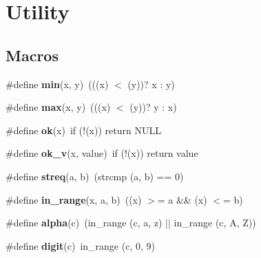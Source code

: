 \hypertarget{group__util}{}\section{Utility}
\label{group__util}
\subsection*{Macros}
\begin{DoxyCompactItemize}
\item 
\mbox{\label{group__util_gabb702d8b501669a23aa0ab3b281b9384}} 
\#define {\bfseries min}(x,  y)~(((x) $<$ (y))? x \+: y)
\item 
\mbox{\label{group__util_gac39d9cef6a5e030ba8d9e11121054268}} 
\#define {\bfseries max}(x,  y)~(((x) $<$ (y))? y \+: x)
\item 
\mbox{\label{group__util_ga978d2d13a74f00232a0dfa306776a343}} 
\#define {\bfseries ok}(x)~if (!(x)) return N\+U\+LL
\item 
\mbox{\label{group__util_ga2e5f7da3a0f150887e71ad1904250a6a}} 
\#define {\bfseries ok\+\_\+v}(x,  value)~if (!(x)) return value
\item 
\mbox{\label{group__util_ga142287b2552d8354d673374eb4da4232}} 
\#define {\bfseries streq}(a,  b)~(strcmp (a, b) == 0)
\item 
\mbox{\label{group__util_ga7b002d2f1af1d22f254ff7d0ec562e4d}} 
\#define {\bfseries in\+\_\+range}(x,  a,  b)~((x) $>$= a \&\& (x) $<$= b)
\item 
\mbox{\label{group__util_ga0baaa8aae76c1e2b628ecd9fbe530246}} 
\#define {\bfseries alpha}(c)~(in\+\_\+range (c, \textquotesingle{}a\textquotesingle{}, \textquotesingle{}z\textquotesingle{}) $\vert$$\vert$ in\+\_\+range (c, \textquotesingle{}A\textquotesingle{}, \textquotesingle{}Z\textquotesingle{}))
\item 
\mbox{\label{group__util_gafaa414047311c37a0f8a652d0d4c571b}} 
\#define {\bfseries digit}(c)~in\+\_\+range (c, \textquotesingle{}0\textquotesingle{}, \textquotesingle{}9\textquotesingle{})
\item 
$$
\end{DoxyCompactItemize}
